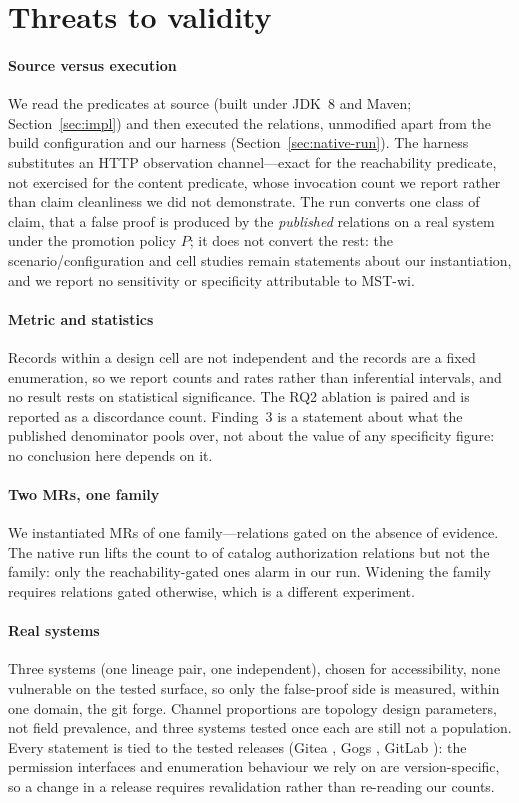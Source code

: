 \section{Threats to validity}
\label{sec:threats}

\paragraph{Source versus execution} We read the predicates at source (built under JDK~8 and
Maven; Section~\ref{sec:impl}) and then executed the relations, unmodified apart from the build
configuration and our harness (Section~\ref{sec:native-run}). The harness substitutes an HTTP
observation channel---exact for the reachability predicate, not exercised for the content
predicate, whose invocation count we report rather than claim cleanliness we did not
demonstrate. The run converts one class of claim, that a false proof is produced by the
\emph{published} relations on a real system under the promotion policy $P$; it does not convert
the rest: the scenario/configuration and cell studies remain statements about our instantiation,
and we report no sensitivity or specificity attributable to \mbox{MST-wi}.

\paragraph{Metric and statistics} Records within a design cell are not independent and the
records are a fixed enumeration, so we report counts and rates rather than inferential
intervals, and no result rests on statistical significance. The RQ2 ablation is paired and is
reported as a discordance count. Finding~3 is a statement about what the published denominator
pools over, not about the value of any specificity figure: no conclusion here depends on it.

\paragraph{Two MRs, one family} We instantiated \ResDesignMrs{} MRs of one family---relations
gated on the absence of evidence. The native run lifts the count to \NtMrExecuted{} of
\ResArtAuthzMrTotal{} catalog authorization relations but not the family: only the
reachability-gated ones alarm in our run. Widening the family requires relations gated
otherwise, which is a different experiment.

\paragraph{Real systems} Three systems (one lineage pair, one independent), chosen for
accessibility, none vulnerable on the tested surface, so only the false-proof side is measured,
within one domain, the git forge. Channel proportions are topology design parameters, not field
prevalence, and three systems tested once each are still not a population. Every statement is
tied to the tested releases (Gitea \ResRsVersion{}, Gogs \GgVersion{}, GitLab \GlVersion{}):
the permission interfaces and enumeration behaviour we rely on are version-specific, so a
change in a release requires revalidation rather than re-reading our counts.

